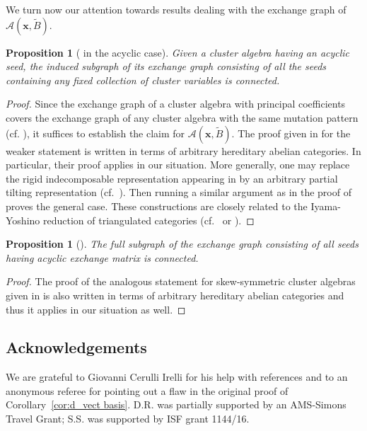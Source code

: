 \documentclass[pdftex]{sigma}
\newcommand{\bfx}{\mathbf{x}}
\newcommand{\cA}{\mathcal{A}}
\newtheorem{Proposition}[Theorem]{Proposition}
 { \theoremstyle{definition}
\newtheorem{Definition}[Theorem]{Definition}
\newtheorem{Note}[Theorem]{Note}
\newtheorem{Example}[Theorem]{Example}
\newtheorem{Remark}[Theorem]{Remark} }
\begin{document}
  We turn now our attention towards results dealing with the exchange graph of $\cA(\bfx,\widetilde{B})$.

  \begin{Proposition}[{\cite[Conjecture 3.10]{reading-speyer}} in the acyclic case]
    Given a cluster algebra having an acyclic seed, the induced subgraph of its exchange graph consisting of all the seeds containing any fixed collection of cluster variables is connected.
  \end{Proposition}
  \begin{proof}
    Since the exchange graph of a cluster algebra with principal coefficients covers the exchange graph of any cluster algebra with the same mutation pattern (cf. \cite{fomin-zelevinsky4}), it suffices to establish the claim for $\cA(\bfx,\widetilde{B})$.
    The proof given in \cite[Corollary 3]{caldero-keller2} for the weaker statement \cite[Conjecture 4.14(3)]{FZ03} is written in terms of arbitrary hereditary abelian categories.
    In particular, their proof applies in our situation.
    More generally, one may replace the rigid indecomposable representation appearing in \cite[Section 5.4]{caldero-keller2} by an arbitrary partial tilting representation (cf.~\cite[Proposition 3]{happel-rickard-schofield}).
    Then running a similar argument as in the proof of \cite[Theorem 6]{caldero-keller2} proves the general case.
    These constructions are closely related to the Iyama-Yoshino reduction of triangulated categories (cf.~\cite[Section 4]{iyama-yoshino} or \cite[Section 7.2]{keller}).
  \end{proof}

  \begin{Proposition}[{\cite[Conjecture 4.14(4)]{FZ03}}]
    The full subgraph of the exchange graph consisting of all seeds having acyclic exchange matrix is connected.
  \end{Proposition}
  \begin{proof}
    The proof of the analogous statement for skew-symmetric cluster algebras given in \cite[Corollary 4]{caldero-keller2} is also written in terms of arbitrary hereditary abelian categories and thus it applies in our situation as well.
  \end{proof}

\subsection*{Acknowledgements}
  We are grateful to Giovanni Cerulli Irelli for his help with references and to an anonymous referee for pointing out a flaw in the original proof of Corollary~\ref{cor:d_vect basis}. 
  D.R. was partially supported by an AMS-Simons Travel Grant; S.S. was supported by ISF grant 1144/16.



\end{document}
